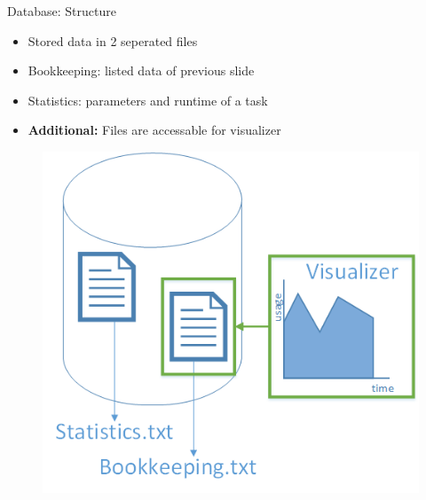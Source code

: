 	\begin{frame}{Database: Structure}
		\begin{minipage}[]{.5\textwidth}%
		\begin{itemize}
		\item<2->{} {Stored data in 2 seperated files}
		\item<3->{} {Bookkeeping: listed data of previous slide}
		\item<4->{} {Statistics: parameters and runtime of a task}
		\item<5->{} {\textbf{Additional: }Files are accessable for visualizer}
		\end{itemize}
		\end{minipage}
		\begin{minipage}[]{.45\textwidth}%
		\begin{figure}[h]
		\flushright  %
		\vspace{-\ht\strutbox}\includegraphics[width=\textwidth]{images/Task/data.png}
		\end{figure}
		\end{minipage}
	\end{frame}
